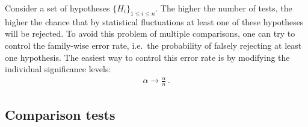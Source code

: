     \begin{construct}
        Consider a set of hypotheses $\{H_i\}_{1\leq i\leq n}$. The higher the number of tests, the higher the chance that by statistical fluctuations at least one of these hypotheses will be rejected. To avoid this problem of multiple comparisons, one can try to control the family-wise error rate, i.e.~the probability of falsely rejecting at least one hypothesis. The easiest way to control this error rate is by modifying the individual significance levels:
        \begin{gather}
            \alpha\longrightarrow\frac{\alpha}{n}\,.
        \end{gather}
    \end{construct}

\subsection{Comparison tests}

